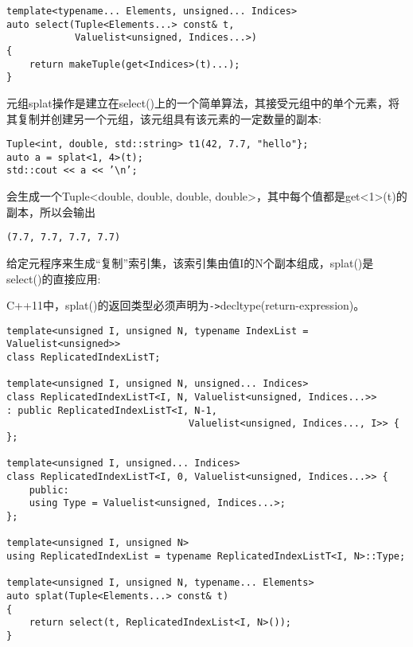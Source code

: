 \begin{lstlisting}[style=styleCXX]
template<typename... Elements, unsigned... Indices>
auto select(Tuple<Elements...> const& t,
			Valuelist<unsigned, Indices...>)
{
	return makeTuple(get<Indices>(t)...);
}
\end{lstlisting}

元组splat操作是建立在select()上的一个简单算法，其接受元组中的单个元素，将其复制并创建另一个元组，该元组具有该元素的一定数量的副本:

\begin{lstlisting}[style=styleCXX]
Tuple<int, double, std::string> t1(42, 7.7, "hello"};
auto a = splat<1, 4>(t);
std::cout << a << ’\n’;
\end{lstlisting}

会生成一个Tuple<double, double, double, double>，其中每个值都是get<1>(t)的副本，所以会输出

\begin{lstlisting}[style=styleCXX]
(7.7, 7.7, 7.7, 7.7)
\end{lstlisting}

给定元程序来生成“复制”索引集，该索引集由值I的N个副本组成，splat()是select()的直接应用:

\begin{tcolorbox}[colback=webgreen!5!white,colframe=webgreen!75!black]
\hspace*{0.75cm}C++11中，splat()的返回类型必须声明为\texttt{->}decltype(return-expression)。
\end{tcolorbox}

\begin{lstlisting}[style=styleCXX]
template<unsigned I, unsigned N, typename IndexList = Valuelist<unsigned>>
class ReplicatedIndexListT;

template<unsigned I, unsigned N, unsigned... Indices>
class ReplicatedIndexListT<I, N, Valuelist<unsigned, Indices...>>
: public ReplicatedIndexListT<I, N-1,
								Valuelist<unsigned, Indices..., I>> {
};

template<unsigned I, unsigned... Indices>
class ReplicatedIndexListT<I, 0, Valuelist<unsigned, Indices...>> {
	public:
	using Type = Valuelist<unsigned, Indices...>;
};

template<unsigned I, unsigned N>
using ReplicatedIndexList = typename ReplicatedIndexListT<I, N>::Type;

template<unsigned I, unsigned N, typename... Elements>
auto splat(Tuple<Elements...> const& t)
{
	return select(t, ReplicatedIndexList<I, N>());
}
\end{lstlisting}

